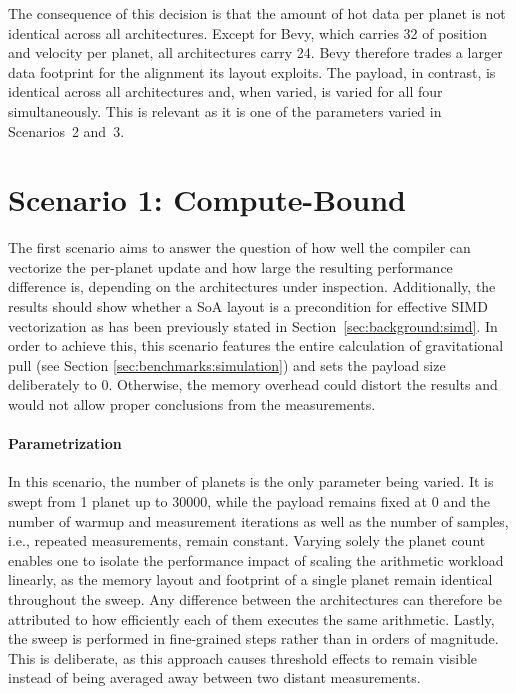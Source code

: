 The consequence of this decision is that the amount of hot data per planet is not identical across all architectures. Except for Bevy, which carries \qty{32}{\byte} of position and velocity per planet, all architectures carry \qty{24}{\byte}. Bevy therefore trades a larger data footprint for the alignment its layout exploits. The payload, in contrast, is identical across all architectures and, when varied, is varied for all four simultaneously. This is relevant as it is one of the parameters varied in Scenarios~2 and~3.

\section{Scenario 1: Compute-Bound}
\label{sec:benchmarks:scenario1}
The first scenario aims to answer the question of how well the compiler can vectorize the per-planet update and how large the resulting performance difference is, depending on the architectures under inspection. Additionally, the results should show whether a \ac{SoA} layout is a precondition for effective \ac{SIMD} vectorization as has been previously stated in Section~\ref{sec:background:simd}. In order to achieve this, this scenario features the entire calculation of gravitational pull (see Section \ref{sec:benchmarks:simulation}) and sets the payload size deliberately to \qty{0}{\byte}. Otherwise, the memory overhead could distort the results and would not allow proper conclusions from the measurements.

\paragraph{Parametrization}
In this scenario, the number of planets is the only parameter being varied. It is swept from \num{1} planet up to \num{30000}, while the payload remains fixed at \qty{0}{\byte} and the number of warmup and measurement iterations as well as the number of samples, i.e., repeated measurements, remain constant. Varying solely the planet count enables one to isolate the performance impact of scaling the arithmetic workload linearly, as the memory layout and footprint of a single planet remain identical throughout the sweep. Any difference between the architectures can therefore be attributed to how efficiently each of them executes the same arithmetic. Lastly, the sweep is performed in fine-grained steps rather than in orders of magnitude. This is deliberate, as this approach causes threshold effects to remain visible instead of being averaged away between two distant measurements.

